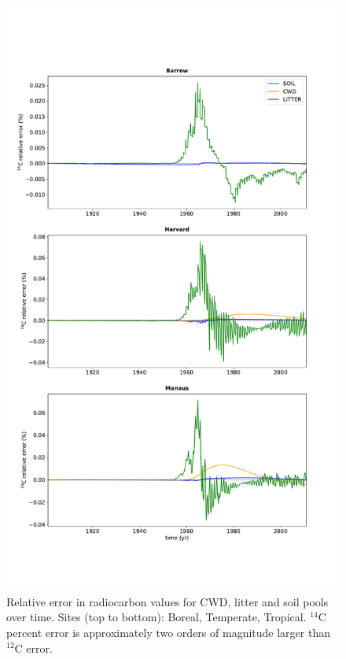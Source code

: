 \documentclass[11pt,a4paper]{article}
\begin{document}
\begin{figure}[htbp]
        \centering 
        \vspace{-8em}
        \includegraphics[width=1.0\linewidth]{figs/C14_through_time_rel_err_10.pdf}
        \vspace{-4em}
        \caption{Relative error in radiocarbon values for CWD, litter and soil pools over time. Sites (top to bottom): Boreal, Temperate, Tropical. $^{14}$C percent error is approximately two orders of magnitude larger than $^{12}$C error. 
            }
        \label{fig:10dayErrorOverTime}
\end{figure}    
\end{document}

